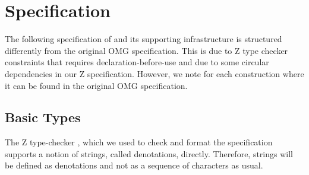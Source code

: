 
\section{Specification} \label{sec:infra}

The following specification of \corbasec{} and its supporting infrastructure is
structured differently from the original OMG specification.  This is due to Z
type checker constraints that requires declaration-before-use and due to some
circular dependencies in our Z specification.  However, we note for each
construction where it can be found in the original OMG specification.

%
%
%

\subsection{Basic Types} \label{sec:types}

\vspace{2ex}

The Z type-checker \Zeta , which we used to check and format the specification
supports a notion of strings, called denotations, directly.  Therefore, strings
will be defined as denotations and not as a sequence of characters as usual.

